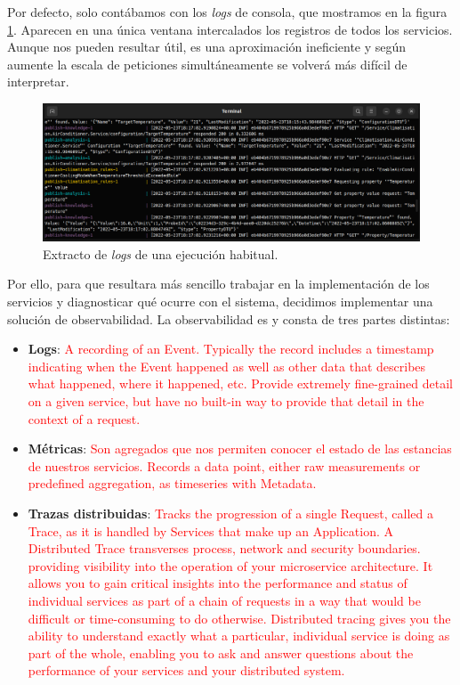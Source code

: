 Por defecto, solo contábamos con los \emph{logs} de consola, que mostramos en la figura \ref{fig:console-logs}. Aparecen en una única ventana intercalados los registros de todos los servicios. Aunque nos pueden resultar útil, es una aproximación ineficiente y según aumente la escala de peticiones simultáneamente se volverá más difícil de interpretar.

\begin{figure}[h]
  \centering
  \includegraphics[scale=1.45]{cap_caso-estudio/images/console-logs}
  \caption{Extracto de \emph{logs} de una ejecución habitual.}
  \label{fig:console-logs}
\end{figure}

Por ello, para que resultara más sencillo trabajar en la implementación de los servicios y diagnosticar qué ocurre con el sistema, decidimos implementar una solución de observabilidad. La observabilidad es \cite{parkerProblemDistributedTracing2020} y consta de tres partes distintas: %
\begin{itemize}
  \item \textbf{Logs}: \textcolor{red}{A recording of an Event. Typically the record includes a timestamp indicating when the Event happened as well as other data that describes what happened, where it happened, etc. \cite{opentelemetryOpenTelemetryDocumentation2022} Provide extremely fine-grained detail on a given service, but have no built-in way to provide that detail in the context of a request. \cite{parkerProblemDistributedTracing2020}}
  \item \textbf{Métricas}: \textcolor{red}{Son agregados que nos permiten conocer el estado de las estancias de nuestros servicios. Records a data point, either raw measurements or predefined aggregation, as timeseries with Metadata. \cite{opentelemetryOpenTelemetryDocumentation2022}}
  \item \textbf{Trazas distribuidas}: \textcolor{red}{Tracks the progression of a single Request, called a Trace, as it is handled by Services that make up an Application. A Distributed Trace transverses process, network and security boundaries. \cite{opentelemetryOpenTelemetryDocumentation2022}  providing visibility into the operation of your microservice architecture. It allows you to gain critical insights into the performance and status of individual services as part of a chain of requests in a way that would be difficult or time-consuming to do otherwise. Distributed tracing gives you the ability to understand exactly what a particular, individual service is doing as part of the whole, enabling you to ask and answer questions about the performance of your services and your distributed system. \cite{parkerProblemDistributedTracing2020}}
\end{itemize}

